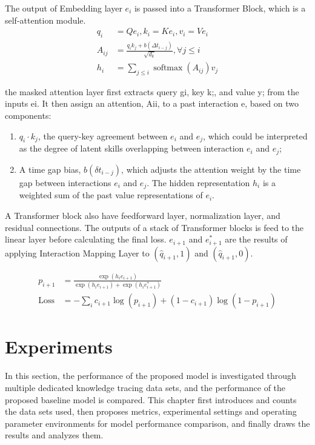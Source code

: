 The output of Embedding layer \(e_i\) is passed into a Transformer Block, which is a self-attention module.
\begin{align}
	q_{i}   & =Q e_{i}, k_{i}=K e_{i}, v_{i}=V e_{i}                                \\
	A_{i j} & =\frac{q_{i} k_{j}+b(\Delta t_{i-j})}{\sqrt{d_{k}}}, \forall j \leq i \\
	h_{i}   & =\sum_{j \leq i} \operatorname{softmax}(A_{i j}) v_{j}
\end{align}

the masked attention layer first extracts query gi, key k;, and value y; from the inputs ei. It then assign an attention, Aii, to a past interaction e, based on two components:
\begin{enumerate}
	\item \(q_i\cdot k_j\), the query-key agreement between \(e_i\) and \(e_j\), which could be interpreted as the degree of latent skills overlapping between interaction \(e_i\) and \(e_j\);
	\item A time gap bias, \(b(\delta t_{i-j})\), which adjusts the attention weight by the time gap between interactions \(e_i\) and \(e_j\). The hidden representation \(h_i\) is a weighted sum of the past value representations of \(e_i\).
\end{enumerate}

A Transformer block also have feedforward layer, normalization layer, and residual connections. The outputs of a stack of Transformer blocks is feed to the linear layer before calculating the final loss. \(e_{i+1}\) and \(e_{i+1}^*\) are the results of applying Interaction Mapping Layer to \((\hat{q}_{i+1}, 1)\) and \((\hat{q}_{i+1}, 0)\).

\begin{align}
	p_{i+1}     & =\frac{\exp (h_{i} e_{i+1})}{\exp (h_{i} e_{i+1})+\exp (h_{i} e_{i+1}^{*})} \\
	\text{Loss} & =-\sum_{i} c_{i+1} \log (p_{i+1})+(1-c_{i+1}) \log (1-p_{i+1})
\end{align}





\section{Experiments}
In this section, the performance of the proposed model is investigated through multiple dedicated knowledge tracing data sets, and the performance of the proposed baseline model is compared. This chapter first introduces and counts the data sets used, then proposes metrics, experimental settings and operating parameter environments for model performance comparison, and finally draws the results and analyzes them.


